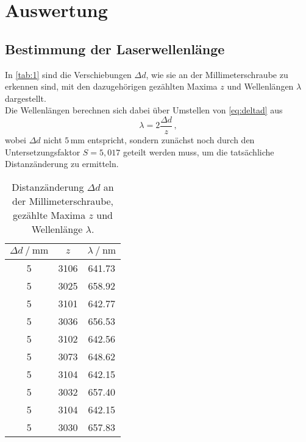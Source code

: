\section{Auswertung}
\label{sec:auswertung}

\subsection{Bestimmung der Laserwellenlänge}

In \autoref{tab:1} sind die Verschiebungen $\Delta d$, wie sie an der Millimeterschraube zu erkennen sind, mit den dazugehörigen gezählten Maxima $z$ und Wellenlängen $\lambda$ dargestellt. \\

Die Wellenlängen berechnen sich dabei über Umstellen von \eqref{eq:deltad} aus
\begin{equation*}
    \lambda = 2 \dfrac{\Delta d}{z} \,,
\end{equation*}
wobei $\Delta d$ nicht $5 \,\si{\milli\meter}$ entspricht, sondern zunächst noch durch den Untersetzungsfaktor $S = 5,017$ geteilt werden muss, um die tatsächliche Distanzänderung zu ermitteln.

\begin{table}[H]
    \centering
    \caption{Distanzänderung $\Delta d$ an der Millimeterschraube, gezählte Maxima $z$ und Wellenlänge $\lambda$.}
    \label{tab:1}
    \begin{tabular}{S[table-format=1.0] S[table-format=4.0] S[table-format=3.2]}
      \toprule
    {$\Delta d \mathbin{/} \si{\milli\meter}$} & {$z$} & {$\lambda \mathbin{/} \si{\nano\meter}$} \\
                &           3106          &           641.73             \\
        5          &           3025          &           658.92             \\
        5          &           3101          &           642.77             \\
        5          &           3036          &           656.53             \\
        5          &           3102          &           642.56             \\
        5          &           3073          &           648.62             \\
        5          &           3104          &           642.15             \\
        5          &           3032          &           657.40             \\
        5          &           3104          &           642.15             \\
        5          &           3030          &           657.83             \\
    \bottomrule
    \end{tabular}
\end{table}


